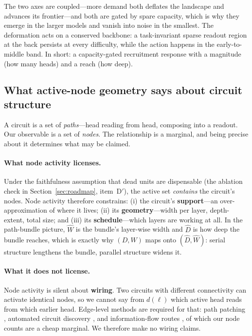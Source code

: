 \documentclass[11pt]{article}
\newcommand{\dl}{d(\ell)}
\newcommand{\Dh}{\hat{D}}
\newcommand{\Wh}{\hat{W}}
\begin{document}
The two axes are coupled---more demand both deflates the landscape and
advances its frontier---and both are gated by spare capacity, which is why
they emerge in the larger models and vanish into noise in the smallest. The
deformation acts on a conserved backbone: a task-invariant sparse readout
region at the back persists at every difficulty, while the action happens in
the early-to-middle band. In short: a capacity-gated recruitment response with
a magnitude (how many heads) and a reach (how deep).

\subsection{What active-node geometry says about circuit structure}
\label{sec:circuits}
A circuit is a set of \emph{paths}---head reading from head, composing into a
readout. Our observable is a set of \emph{nodes}. The relationship is a
marginal, and being precise about it determines what may be claimed.

\paragraph{What node activity licenses.}
Under the faithfulness assumption that dead units are dispensable (the
ablation check in Section~\ref{sec:roadmap}, item~D$'$), the active set
\emph{contains} the circuit's nodes. Node activity therefore constrains:
(i) the circuit's \textbf{support}---an over-approximation of where it lives;
(ii) its \textbf{geometry}---width per layer, depth-extent, total size; and
(iii) its \textbf{schedule}---which layers are working at all. In the
path-bundle picture, $\Wh$ is the bundle's layer-wise width and $\Dh$ is how
deep the bundle reaches, which is exactly why $(D,W)$ maps onto $(\Dh,\Wh)$:
serial structure lengthens the bundle, parallel structure widens it.

\paragraph{What it does not license.}
Node activity is silent about \textbf{wiring}. Two circuits with different
connectivity can activate identical nodes, so we cannot say from $\dl$ which
active head reads from which earlier head. Edge-level methods are required for
that: path patching \citep{goldowsky2023localizing}, automated circuit
discovery \citep{conmy2023towards,syed2023attribution}, and information-flow
routes \citep{ferrando2024information}, of which our node counts are a cheap
marginal. We therefore make no wiring claims.
\end{document}
